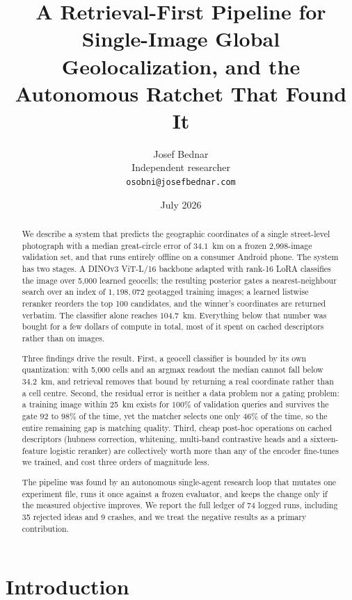 \documentclass[11pt,a4paper]{article}
\title{\bfseries A Retrieval-First Pipeline for Single-Image Global\\
Geolocalization, and the Autonomous Ratchet That Found It}
\author{Josef Bednar\\
\small Independent researcher\\
\small \texttt{osobni@josefbednar.com}}
\date{July 2026}
\begin{document}
\maketitle

\begin{abstract}
\noindent
We describe a system that predicts the geographic coordinates of a single street-level
photograph with a median great-circle error of $34.1$~km on a frozen 2{,}998-image
validation set, and that runs entirely offline on a consumer Android phone. The system has
two stages. A DINOv3 ViT-L/16 backbone adapted with rank-16 LoRA classifies the image over
5{,}000 learned geocells; the resulting posterior gates a nearest-neighbour search over an
index of $1{,}198{,}072$ geotagged training images; a learned listwise reranker reorders the
top 100 candidates, and the winner's coordinates are returned verbatim. The classifier alone
reaches $104.7$~km. Everything below that number was bought for a few dollars of compute in
total, most of it spent on cached descriptors rather than on images.

Three findings drive the result. First, a geocell classifier is bounded by its own
quantization: with 5{,}000 cells and an argmax readout the median cannot fall below
$34.2$~km, and retrieval removes that bound by returning a real coordinate rather than a
cell centre. Second, the residual error is neither a data problem nor a gating problem: a
training image within 25~km exists for $100\%$ of validation queries and survives the gate
$92$ to $98\%$ of the time, yet the matcher selects one only $46\%$ of the time, so the
entire remaining gap is matching quality. Third, cheap post-hoc operations on cached
descriptors (hubness correction, whitening, multi-band contrastive heads and a
sixteen-feature logistic reranker) are collectively worth more than any of the encoder
fine-tunes we trained, and cost three orders of magnitude less.

The pipeline was found by an autonomous single-agent research loop that mutates one
experiment file, runs it once against a frozen evaluator, and keeps the change only if the
measured objective improves. We report the full ledger of 74 logged runs, including 35
rejected ideas and 9 crashes, and we treat the negative results as a primary contribution.
\end{abstract}

\section{Introduction}
\end{document}

